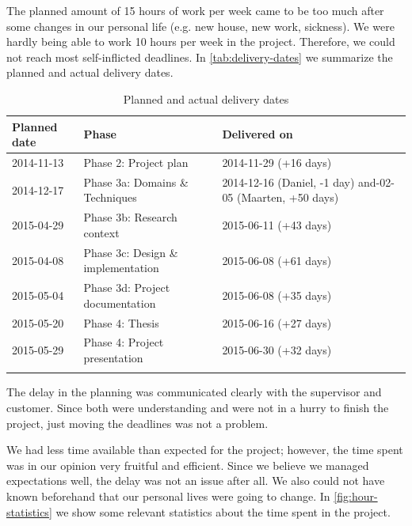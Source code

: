 The planned amount of 15 hours of work per week came to be too much after some changes in our personal life (e.g. new house, new work, sickness).
We were hardly being able to work 10 hours per week in the project.
Therefore, we could not reach most self-inflicted deadlines.
In \autoref{tab:delivery-dates} we summarize the planned and actual delivery dates.%
%
\begin{longtable}{|l|l|p{6cm}|}\hline
    \textbf{Planned date} & \textbf{Phase} & \textbf{Delivered on} \\\hline
	\endhead
    2014-11-13 & Phase 2: Project plan  & 2014-11-29 (+16 days)\\\hline
    2014-12-17 & Phase 3a: Domains \& Techniques  & 2014-12-16 (Daniel, -1 day) and\newline
                                                    2015-02-05 (Maarten, +50 days) \\\hline
    2015-04-29 & Phase 3b: Research context  & 2015-06-11 (+43 days) \\\hline
    2015-04-08 & Phase 3c: Design \& implementation  & 2015-06-08 (+61 days) \\\hline
    2015-05-04 & Phase 3d: Project documentation  & 2015-06-08 (+35 days) \\\hline
    2015-05-20 & Phase 4: Thesis  & 2015-06-16 (+27 days) \\\hline
    2015-05-29 & Phase 4: Project presentation  & 2015-06-30 (+32 days) \\\hline
  \caption{Planned and actual delivery dates}
  \label{tab:delivery-dates}
\end{longtable}%
%
The delay in the planning was communicated clearly with the supervisor and customer.
Since both were understanding and were not in a hurry to finish the project, just moving the deadlines was not a problem.

We had less time available than expected for the project; however, the time spent was in our opinion very fruitful and efficient.
Since we believe we managed expectations well, the delay was not an issue after all.
We also could not have known beforehand that our personal lives were going to change.
In \autoref{fig:hour-statistics} we show some relevant statistics about the time spent in the project.


